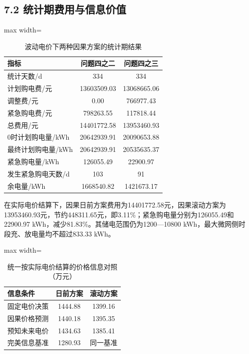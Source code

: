 \documentclass[UTF8,a4paper,zihao=-4,fontset=windows]{ctexart}
\begin{document}
\subsection{7.2 统计期费用与信息价值}
\begin{table}[H]\centering\caption{波动电价下两种因果方案的统计期结果}
\fontsize{9.5}{12}\selectfont\setlength{\tabcolsep}{4pt}\renewcommand{\arraystretch}{1.12}
\begin{adjustbox}{max width=\linewidth}\begin{tabular}{lcc}\toprule
指标 & 问题四之二 & 问题四之三\\\midrule
统计天数/d & 334 & 334\\
计划购电费/元 & 13603509.03 & 13068665.06\\
调整费/元 & 0.00 & 766977.43\\
紧急购电费/元 & 798263.55 & 117818.44\\
总费用/元 & 14401772.58 & 13953460.93\\
0时计划购电量/kWh & 20642939.91 & 20090653.88\\
最终计划购电量/kWh & 20642939.91 & 20535635.37\\
紧急购电量/kWh & 126055.49 & 22900.97\\
发生紧急购电天数/d & 103 & 91\\
余电量/kWh & 1668540.82 & 1421673.17\\
\bottomrule\end{tabular}\end{adjustbox}\end{table}
在实际电价结算下，因果日前方案费用为14401772.58元，因果滚动方案为13953460.93元，节约448311.65元，即3.11\%；紧急购电量分别为126055.49和22900.97 kWh，减少81.83\%。其储电范围仍为1200—10800 kWh，最大微网侧时段充、放电量均不超过833.33 kWh。
\par
\begin{table}[H]\centering\caption{统一按实际电价结算的价格信息对照（万元）}
\fontsize{9.5}{12}\selectfont\setlength{\tabcolsep}{4pt}\renewcommand{\arraystretch}{1.12}
\begin{adjustbox}{max width=\linewidth}\begin{tabular}{lcc}\toprule
信息条件 & 日前方案 & 滚动方案\\\midrule
固定电价决策 & 1444.88 & 1399.16\\
因果价格预测 & 1440.18 & 1395.35\\
预知未来电价 & 1434.63 & 1385.41\\
完美信息基准 & 1280.93 & 同一基准\\
\bottomrule\end{tabular}\end{adjustbox}\end{table}
\end{document}
